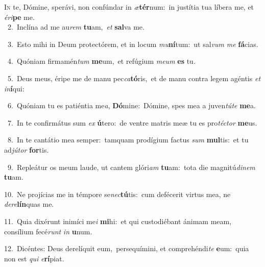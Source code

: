 \lettrine{\initial\textcolor{\initialcolor}{I}}{n} te, Dómine, sperávi, non confúndar in \textit{æ}\-\textbf{tér}num:~\star in justítia tua líbera me, et \textit{é}\-\textit{ri}\textbf{pe} me.\\
{\numbfont\textcolor{\numbcolor}{~2.}}~Inclína ad me au\textit{rem} \textbf{tu}\-am,~\star \textit{et} \textbf{sal}\-va me.\par
{\numbfont\textcolor{\numbcolor}{~3.}}~Esto mihi in Deum protectórem, et in locum \textit{mu}\-\textbf{ní}tum:~\star ut sal\textit{vum} \textit{me} \textbf{fá}\-cias.\par
{\numbfont\textcolor{\numbcolor}{~4.}}~Quóniam firmamén\textit{tum} \textbf{me}\-um,~\star et refúgium \textit{me}\-\textit{um} \textbf{es} tu.\par
{\numbfont\textcolor{\numbcolor}{~5.}}~Deus meus, éripe me de manu pec\-\textit{ca}\-\textbf{tó}ris,~\star et de manu contra legem agéntis \textit{et} \textit{in}\-\textbf{í}qui:\par
{\numbfont\textcolor{\numbcolor}{~6.}}~Quóniam tu es patiéntia me\-\textit{a}\-, \textbf{Dó}\-mine:~\star Dómine, spes mea a juven\-\textit{tú}\-\textit{te} \textbf{me}\-a.\par
{\numbfont\textcolor{\numbcolor}{~7.}}~In te confirmátus sum \textit{ex} \textbf{ú}\-tero:~\star de ventre matris meæ tu es pro\-\textit{téc}\-\textit{tor} \textbf{me}\-us.\par
{\numbfont\textcolor{\numbcolor}{~8.}}~In te cantátio mea semper:~\dagger tamquam prodígium factus \textit{sum} \textbf{mul}\-tis:~\star et tu ad\-\textit{jú}\-\textit{tor} \textbf{for}\-tis.\par
{\numbfont\textcolor{\numbcolor}{~9.}}~Repleátur os meum laude, ut cantem glóri\textit{am} \textbf{tu}\-am:~\star tota die magnitú\-\textit{di}\-\textit{nem} \textbf{tu}\-am.\par
{\numbfont\textcolor{\numbcolor}{10.}}~Ne projícias me in témpore se\-\textit{nec}\-\textbf{tú}tis:~\star cum defécerit virtus mea, ne \textit{de}\-\textit{re}\textbf{lín}quas me.\par
{\numbfont\textcolor{\numbcolor}{11.}}~Quia dixérunt inimíci me\textit{i} \textbf{mi}\-hi:~\star et qui custodiébant ánimam meam, consílium fecé\textit{runt} \textit{in} \textbf{u}\-num.\par
{\numbfont\textcolor{\numbcolor}{12.}}~Dicéntes: Deus derelíquit eum,~\dagger persequímini, et comprehéndi\textit{te} \textbf{e}\-um:~\star quia non est \textit{qui} \textit{e}\-\textbf{rí}piat.\par
